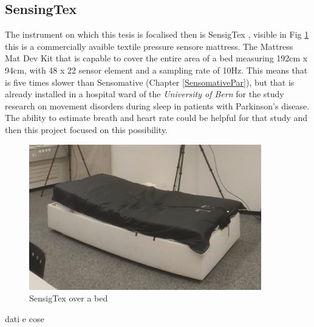\subsection{SensingTex} \label{SensigTexPar}
The instrument on which this tesis is focalised then is SensigTex \cite{SensingConnectivity}, visible in Fig \ref{fig:sensingtex} this is a commercially avaible textile pressure sensore mattress. 
The Mattress Mat Dev Kit that is capable to cover the entire area of a bed measuring 192cm x 94cm, with 48 x 22 sensor element and a sampling rate of 10Hz. This means that is five times slower than Sensomative (Chapter \ref{SensomativePar}), but that is already installed in a hospital ward of the \textit{University of Bern} for the study research on movement disorders during sleep in patients with Parkinson's disease. The ability to estimate breath and heart rate could be helpful for that study and then this project focused on this possibility.
\\


\vspace*{0.5cm}
\begin{figure}[H]
    \centering
    \includegraphics[width=0.9\textwidth]{img/sensingTex.png}
    \caption{SensigTex over a bed}
    \label{fig:sensingtex}
\end{figure}
\vspace*{0.5cm}

dati e cose\\

